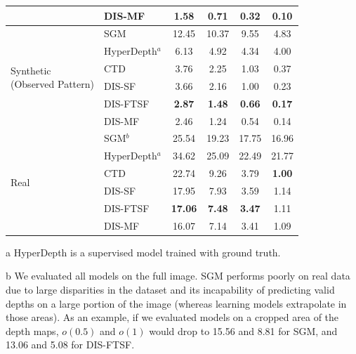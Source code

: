 \begin{table}[!t]
\begin{center}
\begin{threeparttable}
\begin{tabular}{l|lcccc}
        & DIS-MF & \phantom{0}1.58 & \phantom{0}0.71 & \phantom{0}0.32 & \phantom{0}0.10 \\
        \hline
        \hline
        \multirow{6}{*}{ \parbox{20ex}{Synthetic \\ (Observed Pattern)} } & SGM & 12.45 & 10.37 & \phantom{0}9.55 & \phantom{0}4.83 \\
        & HyperDepth$^a$ & \phantom{0}6.13 & \phantom{0}4.92 & \phantom{0}4.34 & \phantom{0}4.00 \\
        & CTD & \phantom{0}3.76 & \phantom{0}2.25 & \phantom{0}1.03 & \phantom{0}0.37 \\
        & DIS-SF & \phantom{0}3.66 & \phantom{0}2.16 & \phantom{0}1.00 & \phantom{0}0.23 \\
        & DIS-FTSF & \phantom{0}\textbf{2.87} & \phantom{0}\textbf{1.48} & \phantom{0}\textbf{0.66} & \phantom{0}\textbf{0.17} \\ \arrayrulecolor{lightgray}\cline{2-6}\arrayrulecolor{black}
        & DIS-MF & \phantom{0}2.46 & \phantom{0}1.24 & \phantom{0}0.54 & \phantom{0}0.14 \\
        \hline
        \hline
        \multirow{6}{*}{\parbox{20ex}{Real}} & SGM$^b$ & 25.54 & 19.23 & 17.75 & 16.96 \\
        & HyperDepth$^a$ & 34.62 & 25.09 & 22.49 & 21.77 \\
        & CTD & 22.74 & \phantom{0}9.26 & \phantom{0}3.79 & \phantom{0}\textbf{1.00} \\
        & DIS-SF & 17.95 & \phantom{0}7.93 & \phantom{0}3.59 & \phantom{0}1.14 \\
        & DIS-FTSF & \textbf{17.06} & \phantom{0}\textbf{7.48} & \phantom{0}\textbf{3.47} & \phantom{0}1.11 \\ \arrayrulecolor{lightgray}\cline{2-6}\arrayrulecolor{black}
        & DIS-MF & 16.07 & \phantom{0}7.14 & \phantom{0}3.41 & \phantom{0}1.09 \\
        \hline
        \end{tabular}
        \begin{tablenotes}
        \item[a] HyperDepth is a supervised model trained with ground truth.
        \item[b] We evaluated all models on the full image. SGM performs poorly on real data due to large disparities in the dataset and its incapability of predicting valid depths on a large portion of the image (whereas learning models extrapolate in those areas). As an example, if we evaluated models on a cropped area of the depth maps, $o(0.5)$ and $o(1)$ would drop to 15.56 and 8.81 for SGM, and 13.06 and 5.08 for DIS-FTSF.

\end{tablenotes}
\end{threeparttable}
\end{center}
\end{table}
